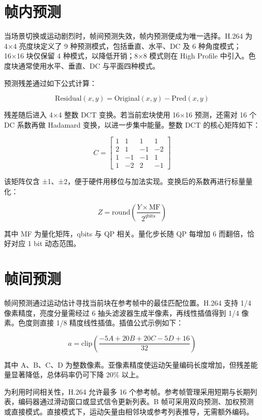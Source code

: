 \chapter{帧内预测}
当场景切换或运动剧烈时，帧间预测失效，帧内预测便成为唯一选择。H.264 为 4×4 亮度块定义了 9 种预测模式，包括垂直、水平、DC 及 6 种角度模式；16×16 块仅保留 4 种模式，以降低开销；8×8 模式则在 High Profile 中引入。色度块通常使用水平、垂直、DC 与平面四种模式。\par
预测残差通过如下公式计算：\par
$$ \text{Residual}(x,y)=\text{Original}(x,y)-\text{Pred}(x,y) $$\par
残差随后进入 4×4 整数 DCT 变换。若当前宏块使用 16×16 预测，还需对 16 个 DC 系数再做 Hadamard 变换，以进一步集中能量。整数 DCT 的核心矩阵如下：\par
$$ C=\begin{bmatrix}1&1&1&1\\2&1&-1&-2\\1&-1&-1&1\\1&-2&2&-1\end{bmatrix} $$\par
该矩阵仅含 ±1、±2，便于硬件用移位与加法实现。变换后的系数再进行标量量化：\par
$$ Z=\text{round}\left(\frac{Y\times\text{MF}}{2^{q\text{bits}}}\right) $$\par
其中 MF 为量化矩阵，qbits 与 QP 相关。量化步长随 QP 每增加 6 而翻倍，恰好对应 1 bit 动态范围。\par
\chapter{帧间预测}
帧间预测通过运动估计寻找当前块在参考帧中的最佳匹配位置。H.264 支持 1/4 像素精度，亮度分量需经过 6 抽头滤波器生成半像素，再线性插值得到 1/4 像素。色度则直接 1/8 精度线性插值。插值公式示例如下：\par
$$ a=\text{clip}\left(\frac{-5A+20B+20C-5D+16}{32}\right) $$\par
其中 A、B、C、D 为整数像素。亚像素精度使运动矢量编码长度增加，但残差能量显著降低，总体码率仍可下降 20\%{} 以上。\par
为利用时间相关性，H.264 允许最多 16 个参考帧。参考帧管理采用短期与长期列表，编码器通过滑动窗口或显式信令更新列表。B 帧可采用双向预测、加权预测或直接模式。直接模式下，运动矢量由相邻块或参考列表推导，无需额外编码。\par
